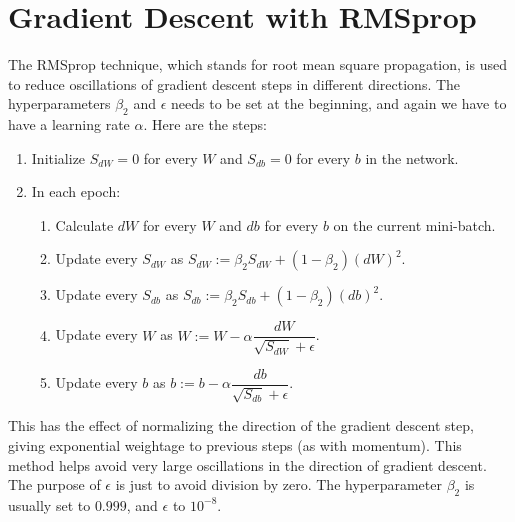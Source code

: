 \documentclass[a4paper, 12pt]{report}
\begin{document}
\section{Gradient Descent with RMSprop}
The RMSprop technique, which stands for root mean square propagation, is used to reduce oscillations of gradient descent steps in different directions. The hyperparameters $\beta_2$ and $\epsilon$ needs to be set at the beginning, and again we have to have a learning rate $\alpha$. Here are the steps:
\begin{enumerate}
\item Initialize $S_{dW}=0$ for every $W$ and $S_{db}=0$ for every $b$ in the network.
\item In each epoch:
\begin{enumerate}
\item Calculate $dW$ for every $W$ and $db$ for every $b$ on the current mini-batch.
\item Update every $S_{dW}$ as $S_{dW} := \beta_2 S_{dW} + (1-\beta_2) (dW)^2$.
\item Update every $S_{db}$ as $S_{db} := \beta_2 S_{db} + (1-\beta_2) (db)^2$.
\item Update every $W$ as $W := W - \alpha \dfrac{dW}{\sqrt{S_{dW}}+\epsilon}$.
\item Update every $b$ as $b := b - \alpha \dfrac{db}{\sqrt{S_{db}}+\epsilon}$.
\end{enumerate}
\end{enumerate}
This has the effect of normalizing the direction of the gradient descent step, giving exponential weightage to previous steps (as with momentum). This method helps avoid very large oscillations in the direction of gradient descent. The purpose of $\epsilon$ is just to avoid division by zero. The hyperparameter $\beta_2$ is usually set to $0.999$, and $\epsilon$ to $10^{-8}$.
\end{document}
